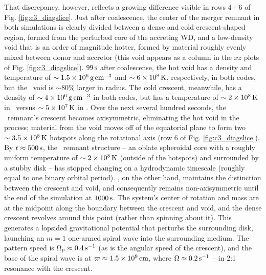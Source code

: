
That discrepancy, however, reflects a growing difference visible in rows 4 - 6 of Fig. \ref{fig:c3_diagslice}.  Just after coalescence, the center of the merger remnant in both simulations is clearly divided between a dense and cold crescent-shaped region, formed from the perturbed core of the accreting WD, and a low-density void that is an order of magnitude hotter, formed by material roughly evenly mixed between donor and accretor (this void appears as a column in the $xz$ plots of Fig. \ref{fig:c3_diagslice}).  $99\,\mathrm{s}$ after coalescense, the hot void has a density and temperature of $\sim1.5\times10^6\,\gcc$ and $\sim6\times10^8\,\mathrm{K}$, respectively, in both codes, but the \arepo\ void is $\sim80$\% larger in radius.  The cold crescent, meanwhile, has a density of $\sim4\times10^6\,\gcc$ in both codes, but has a temperature of $\sim2\times10^8\,\mathrm{K}$ in \gasoline\ versus $\sim5\times10^7\,\mathrm{K}$ in \arepo.  Over the next several hundred seconds, the \gasoline\ remnant's crescent becomes axisymmetric, eliminating the hot void in the process; material from the void moves off of the equatorial plane to form two $\sim3.5\times10^8\,\mathrm{K}$ hotspots along the rotational axis (row 6 of Fig. \ref{fig:c3_diagslice}).  By $t\approx500\,\mathrm{s}$, the \gasoline\ remnant structure -- an oblate spheroidal core with a roughly uniform temperature of $\sim 2 \times 10^8\,\mathrm{K}$ (outside of the hotspots) and surrounded by a stubby disk -- has stopped changing on a hydrodynamic timescale (roughly equal to one binary orbital period).  \arepo, on the other hand, maintains the distinction between the crescent and void, and consequently remains non-axisymmetric until the end of the simulation at $1000\,\mathrm{s}$.  The system's center of rotation and mass are at the midpoint along the boundary between the crescent and void, and the dense crescent revolves around this point (rather than spinning about it).  This generates a lopsided gravitational potential that perturbs the surrounding disk, launching an $m = 1$ one-armed spiral wave into the surrounding medium.  The pattern speed is $\Omega_p \approx 0.4\,\mathrm{s}^{-1}$ (as is the angular speed of the crescent), and the base of the spiral wave is at $\varpi \approx 1.5\times10^9\,\mathrm{cm}$, where $\Omega \approx 0.2\,\mathrm{s}^{-1}$ -- in 2:1 resonance with the crescent.

